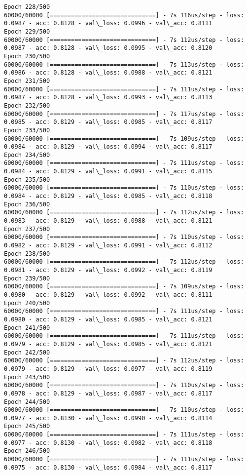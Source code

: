 \documentclass[11pt]{article}
\begin{document}
\begin{Verbatim}[commandchars=\\\{\}]
Epoch 228/500
60000/60000 [==============================] - 7s 116us/step - loss: 0.0987 - acc: 0.8128 - val\_loss: 0.0996 - val\_acc: 0.8111
Epoch 229/500
60000/60000 [==============================] - 7s 112us/step - loss: 0.0987 - acc: 0.8128 - val\_loss: 0.0995 - val\_acc: 0.8120
Epoch 230/500
60000/60000 [==============================] - 7s 113us/step - loss: 0.0986 - acc: 0.8128 - val\_loss: 0.0988 - val\_acc: 0.8121
Epoch 231/500
60000/60000 [==============================] - 7s 111us/step - loss: 0.0987 - acc: 0.8128 - val\_loss: 0.0993 - val\_acc: 0.8113
Epoch 232/500
60000/60000 [==============================] - 7s 117us/step - loss: 0.0985 - acc: 0.8129 - val\_loss: 0.0985 - val\_acc: 0.8117
Epoch 233/500
60000/60000 [==============================] - 7s 109us/step - loss: 0.0984 - acc: 0.8129 - val\_loss: 0.0994 - val\_acc: 0.8117
Epoch 234/500
60000/60000 [==============================] - 7s 111us/step - loss: 0.0984 - acc: 0.8129 - val\_loss: 0.0991 - val\_acc: 0.8115
Epoch 235/500
60000/60000 [==============================] - 7s 110us/step - loss: 0.0984 - acc: 0.8129 - val\_loss: 0.0985 - val\_acc: 0.8118
Epoch 236/500
60000/60000 [==============================] - 7s 112us/step - loss: 0.0983 - acc: 0.8129 - val\_loss: 0.0988 - val\_acc: 0.8121
Epoch 237/500
60000/60000 [==============================] - 7s 110us/step - loss: 0.0982 - acc: 0.8129 - val\_loss: 0.0991 - val\_acc: 0.8112
Epoch 238/500
60000/60000 [==============================] - 7s 112us/step - loss: 0.0981 - acc: 0.8129 - val\_loss: 0.0992 - val\_acc: 0.8119
Epoch 239/500
60000/60000 [==============================] - 7s 109us/step - loss: 0.0980 - acc: 0.8129 - val\_loss: 0.0992 - val\_acc: 0.8111
Epoch 240/500
60000/60000 [==============================] - 7s 111us/step - loss: 0.0980 - acc: 0.8129 - val\_loss: 0.0985 - val\_acc: 0.8121
Epoch 241/500
60000/60000 [==============================] - 7s 111us/step - loss: 0.0979 - acc: 0.8129 - val\_loss: 0.0985 - val\_acc: 0.8121
Epoch 242/500
60000/60000 [==============================] - 7s 112us/step - loss: 0.0979 - acc: 0.8129 - val\_loss: 0.0977 - val\_acc: 0.8119
Epoch 243/500
60000/60000 [==============================] - 7s 110us/step - loss: 0.0978 - acc: 0.8129 - val\_loss: 0.0987 - val\_acc: 0.8117
Epoch 244/500
60000/60000 [==============================] - 7s 110us/step - loss: 0.0977 - acc: 0.8130 - val\_loss: 0.0990 - val\_acc: 0.8114
Epoch 245/500
60000/60000 [==============================] - 7s 111us/step - loss: 0.0977 - acc: 0.8130 - val\_loss: 0.0982 - val\_acc: 0.8118
Epoch 246/500
60000/60000 [==============================] - 7s 111us/step - loss: 0.0975 - acc: 0.8130 - val\_loss: 0.0984 - val\_acc: 0.8117

\end{Verbatim}
\end{document}
